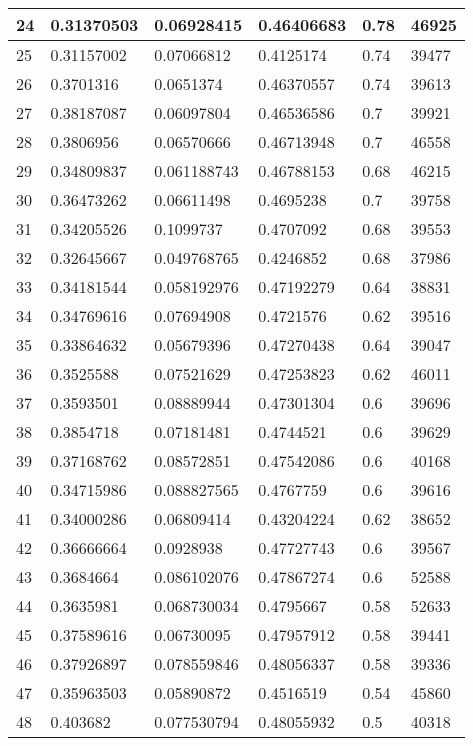 \begin{longtable}{|l|l|l|l|l|l|}
24 & 0.31370503 & 0.06928415 & 0.46406683 & 0.78 & 46925 \\ \hline 
25 & 0.31157002 & 0.07066812 & 0.4125174 & 0.74 & 39477 \\ \hline 
26 & 0.3701316 & 0.0651374 & 0.46370557 & 0.74 & 39613 \\ \hline 
27 & 0.38187087 & 0.06097804 & 0.46536586 & 0.7 & 39921 \\ \hline 
28 & 0.3806956 & 0.06570666 & 0.46713948 & 0.7 & 46558 \\ \hline 
29 & 0.34809837 & 0.061188743 & 0.46788153 & 0.68 & 46215 \\ \hline 
30 & 0.36473262 & 0.06611498 & 0.4695238 & 0.7 & 39758 \\ \hline 
31 & 0.34205526 & 0.1099737 & 0.4707092 & 0.68 & 39553 \\ \hline 
32 & 0.32645667 & 0.049768765 & 0.4246852 & 0.68 & 37986 \\ \hline 
33 & 0.34181544 & 0.058192976 & 0.47192279 & 0.64 & 38831 \\ \hline 
34 & 0.34769616 & 0.07694908 & 0.4721576 & 0.62 & 39516 \\ \hline 
35 & 0.33864632 & 0.05679396 & 0.47270438 & 0.64 & 39047 \\ \hline 
36 & 0.3525588 & 0.07521629 & 0.47253823 & 0.62 & 46011 \\ \hline 
37 & 0.3593501 & 0.08889944 & 0.47301304 & 0.6 & 39696 \\ \hline 
38 & 0.3854718 & 0.07181481 & 0.4744521 & 0.6 & 39629 \\ \hline 
39 & 0.37168762 & 0.08572851 & 0.47542086 & 0.6 & 40168 \\ \hline 
40 & 0.34715986 & 0.088827565 & 0.4767759 & 0.6 & 39616 \\ \hline 
41 & 0.34000286 & 0.06809414 & 0.43204224 & 0.62 & 38652 \\ \hline 
42 & 0.36666664 & 0.0928938 & 0.47727743 & 0.6 & 39567 \\ \hline 
43 & 0.3684664 & 0.086102076 & 0.47867274 & 0.6 & 52588 \\ \hline 
44 & 0.3635981 & 0.068730034 & 0.4795667 & 0.58 & 52633 \\ \hline 
45 & 0.37589616 & 0.06730095 & 0.47957912 & 0.58 & 39441 \\ \hline 
46 & 0.37926897 & 0.078559846 & 0.48056337 & 0.58 & 39336 \\ \hline 
47 & 0.35963503 & 0.05890872 & 0.4516519 & 0.54 & 45860 \\ \hline 
48 & 0.403682 & 0.077530794 & 0.48055932 & 0.5 & 40318 \\ \hline 

\end{longtable}
